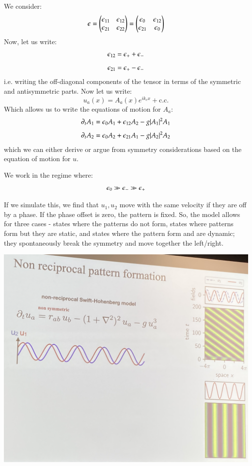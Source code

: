 We consider:
\begin{equation}
    \epsilon =\begin{pmatrix}\epsilon_{11} & \epsilon_{12} \\ \epsilon_{21} & \epsilon_{22}\end{pmatrix} =  \begin{pmatrix}\epsilon_{0} & \epsilon_{12} \\ \epsilon_{21} & \epsilon_0\end{pmatrix}
\end{equation}
Now, let us write:
\begin{equation}
    \epsilon_{12} = \epsilon_+ + \epsilon_-
\end{equation}
\begin{equation}
    \epsilon_{21} = \epsilon_+ - \epsilon_-
\end{equation}
i.e. writing the off-diagonal components of the tensor in terms of the symmetric and antisymmetric parts. Now let us write:
\begin{equation}
    u_a(x) = A_a(x)e^{ik_c x} + \text{c.c.}
\end{equation}
Which allows us to write the equations of motion for $A_a$:
\begin{equation}
    \partial_t A_1 =  \epsilon_0 A_1 + \epsilon_{12}A_2 - g\lvert A_1 \rvert^2A_1
\end{equation}
\begin{equation}
    \partial_t A_2 = \epsilon_0 A_2 + \epsilon_{21}A_1  - g\lvert A_2 \rvert^2A_2
\end{equation}
which we can either derive or argue from symmetry considerations based on the equation of motion for $u$. 

We work in the regime where:
\begin{equation}
    \epsilon_0 \gg \epsilon_- \gg \epsilon_+
\end{equation}

If we simulate this, we find that $u_1, u_2$ move with the same velocity if they are off by a phase. If the phase offset is zero, the pattern is fixed. So, the model allows for three cases - states where the patterns do not form, states where patterns form but they are static, and states where the pattern form and are dynamic; they spontaneously break the symmetry and move together the left/right.

\begin{center}
    \includegraphics[scale=0.3]{Lectures/Images/lec18-wavedynamics.png}
\end{center}

